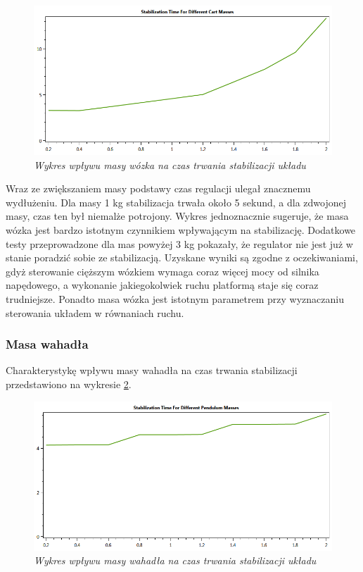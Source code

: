 \documentclass[12pt, oneside]{report}
\theoremstyle{definition}
\begin{document}
\begin{figure}[H]
	\centering
		\includegraphics[width = 350pt]{CartMassQuality} 
		\caption{\textit{Wykres wpływu masy wózka na czas trwania stabilizacji układu}}
		\label{plot:CartMassQuality}
\end{figure}

Wraz ze zwiększaniem masy podstawy czas regulacji ulegał znacznemu wydłużeniu. Dla masy 1 kg stabilizacja trwała około 5 sekund, a dla zdwojonej masy, czas ten był niemalże potrojony. Wykres jednoznacznie sugeruje, że masa wózka jest bardzo istotnym czynnikiem wpływającym na stabilizację. Dodatkowe testy przeprowadzone dla mas powyżej 3 kg pokazały, że regulator nie jest już w stanie poradzić sobie ze stabilizacją. Uzyskane wyniki są zgodne z oczekiwaniami, gdyż sterowanie cięższym wózkiem wymaga coraz więcej mocy od silnika napędowego, a wykonanie jakiegokolwiek ruchu platformą staje się coraz trudniejsze. Ponadto masa wózka jest istotnym parametrem przy wyznaczaniu sterowania układem w równaniach ruchu. 

\newpage
\subsubsection{Masa wahadła}
Charakterystykę wpływu masy wahadła na czas trwania stabilizacji przedstawiono na wykresie \ref{plot:PendulumMassQuality}.
\begin{figure}[H]
	\centering
		\includegraphics[width = 350pt]{PendulumMassQuality} 
		\caption{\textit{Wykres wpływu masy wahadła na czas trwania stabilizacji układu}}
		\label{plot:PendulumMassQuality}
\end{figure}
\end{document}
